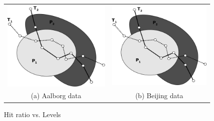 \begin{figure}[htb]
\center
  \begin{tabular}{cc}
     \includegraphics[width=0.3\columnwidth]{figures/poiIntersect.pdf}
     &
     \includegraphics[width=0.3\columnwidth]{figures/poiIntersect.pdf}
      \\
     (a) Aalborg data & (b)  Beijing data
     \end{tabular}
\caption{Hit ratio vs. Levels}
\label{fig:levelVsHitRatio}
\end{figure}